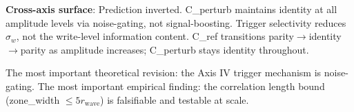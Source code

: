 \documentclass[11pt,a4paper]{article}
\begin{document}
\textbf{Cross-axis surface}: Prediction inverted.
C\_perturb maintains identity at all amplitude levels via noise-gating, not
signal-boosting.
Trigger selectivity reduces $\sigma_w$, not the write-level information content.
C\_ref transitions parity$\to$identity$\to$parity as amplitude increases;
C\_perturb stays identity throughout.

The most important theoretical revision: the Axis IV trigger mechanism is
noise-gating.
The most important empirical finding: the correlation length bound
(zone\_width $\leq 5 r_\text{wave}$) is falsifiable and testable at scale.
\end{document}
